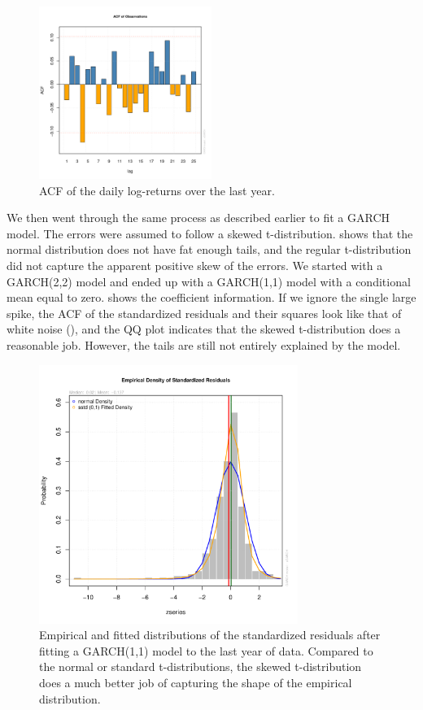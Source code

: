 \documentclass[12pt]{article}
\begin{document}
\begin{figure}[ht]
    \centering
    \includegraphics[width=0.5\textwidth]{acf_one_year.pdf}
    \caption{ACF of the daily log-returns over the last year.}
    \label{fig:acf_one_year}
\end{figure}

We then went through the same process as described earlier to fit a GARCH model. The errors were assumed to follow a skewed t-distribution.  shows that the normal distribution does not have fat enough tails, and the regular t-distribution did not capture the apparent positive skew of the errors. We started with a GARCH(2,2) model and ended up with a GARCH(1,1) model with a conditional mean equal to zero.  shows the coefficient information. If we ignore the single large spike, the ACF of the standardized residuals and their squares look like that of white noise (), and the QQ plot indicates that the skewed t-distribution does a reasonable job. However, the tails are still not entirely explained by the model.

\begin{figure}[h!]
    \centering
    \includegraphics[width=0.75\textwidth]{one_year_residuals.pdf}
    \caption{Empirical and fitted distributions of the standardized residuals after fitting a GARCH(1,1) model to the last year of data. Compared to the normal or standard t-distributions, the skewed t-distribution does a much better job of capturing the shape of the empirical distribution.}
    \label{fig:one_year_residuals}
\end{figure}
\end{document}

